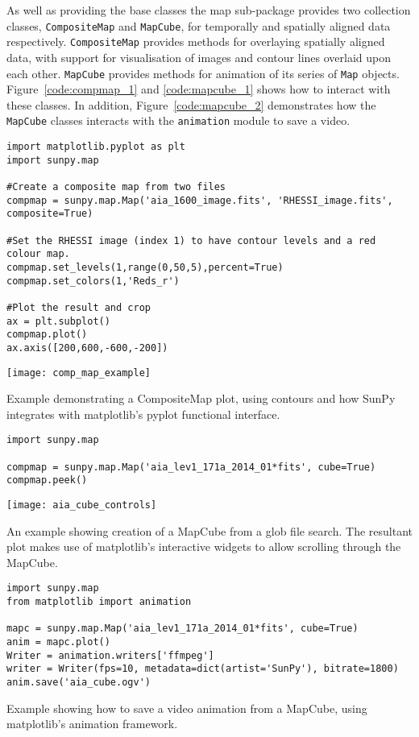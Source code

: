 As well as providing the base classes the map sub-package provides two 
collection classes, \texttt{CompositeMap} and \texttt{MapCube}, for 
temporally and spatially aligned data respectively.
\texttt{CompositeMap} provides methods for overlaying spatially aligned 
data, with support for visualisation of images and contour lines overlaid 
upon each other.
\texttt{MapCube} 
provides methods for animation of its series of \texttt{Map} objects. 
Figure~\ref{code:compmap_1} and \ref{code:mapcube_1} shows how to interact 
with these classes.
In addition, Figure~\ref{code:mapcube_2} demonstrates how the \texttt{MapCube} 
classes interacts with the \texttt{animation} module to save a video.

\begin{listing}[H]
\begin{verbatim}
import matplotlib.pyplot as plt
import sunpy.map

#Create a composite map from two files
compmap = sunpy.map.Map('aia_1600_image.fits', 'RHESSI_image.fits', 
composite=True)

#Set the RHESSI image (index 1) to have contour levels and a red colour map.
compmap.set_levels(1,range(0,50,5),percent=True)
compmap.set_colors(1,'Reds_r')

#Plot the result and crop
ax = plt.subplot()
compmap.plot()
ax.axis([200,600,-600,-200])
\end{verbatim}
\texttt{[image: comp\_map\_example]}
\caption{Example demonstrating a CompositeMap plot, using contours and how 
SunPy integrates with matplotlib's pyplot functional interface.}
\label{code:compmap_1}
\end{listing}

\begin{listing}[H]
\begin{verbatim}
import sunpy.map

compmap = sunpy.map.Map('aia_lev1_171a_2014_01*fits', cube=True)
compmap.peek()
\end{verbatim}
\texttt{[image: aia\_cube\_controls]}
\caption{An example showing creation of a MapCube from a glob file search. The 
resultant plot makes use of matplotlib's interactive widgets to allow scrolling 
through the MapCube.}
\label{code:mapcube_1}
\end{listing}

\begin{listing}[h]
\begin{verbatim}
import sunpy.map
from matplotlib import animation

mapc = sunpy.map.Map('aia_lev1_171a_2014_01*fits', cube=True)
anim = mapc.plot()
Writer = animation.writers['ffmpeg']
writer = Writer(fps=10, metadata=dict(artist='SunPy'), bitrate=1800)
anim.save('aia_cube.ogv')
\end{verbatim}
\caption{Example showing how to save a video animation from a MapCube, using 
matplotlib's animation framework.}
\label{code:mapcube_2}
\end{listing}
